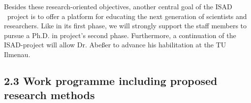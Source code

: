 \documentclass[11pt,a4paper]{article}
\def\PN{\mathrm{ISAD}}
\theoremstyle{plain} \newtheorem{define}{Definition}[section]
\begin{document}
{Besides these research-oriented objectives, another central goal of the $\PN$~project is to offer a platform for educating the next generation of scientists and researchers. Like in its first phase, we will strongly support the staff members to pursue a Ph.D. in project's second phase. Furthermore, a continuation of the $\PN$-project will allow Dr. Abe{\ss}er to advance his habilitation at the TU Ilmenau. 
%



\subsection*{2.3 Work programme including proposed research methods}

}
\end{document}
